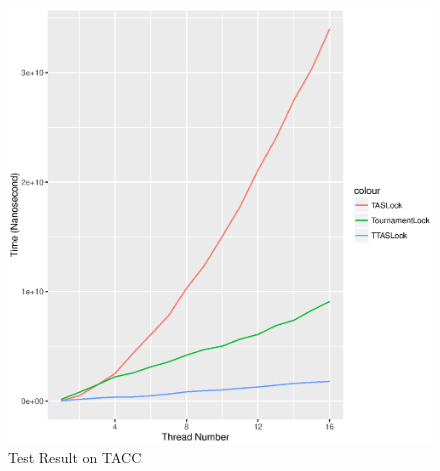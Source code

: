 \documentclass[a4paper]{report}
\begin{document}
\begin{figure}[H]
  \includegraphics[scale=0.8]{result-tacc-7654044}
  \caption{Test Result on TACC}
\end{figure}
\end{document}

